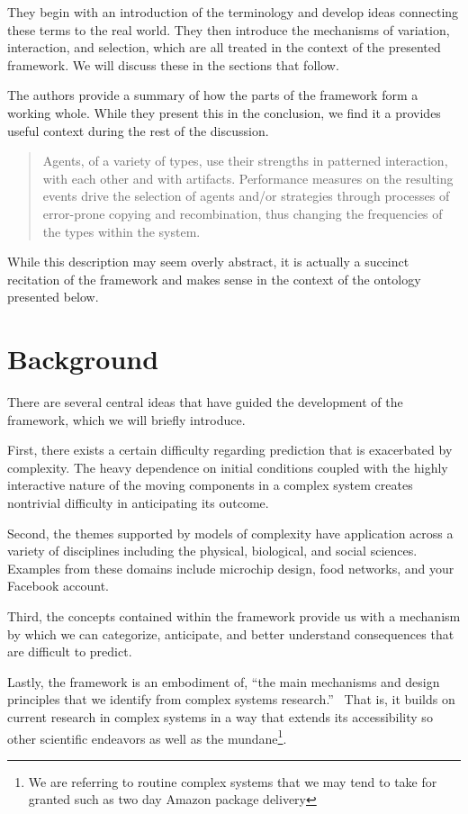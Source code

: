 \documentclass[jou,apacite]{apa6}
\begin{document}
They begin with an introduction of the terminology and develop ideas connecting these terms to the real world.  They then introduce the mechanisms of variation, interaction, and selection, which are all treated in the context of the presented framework.  We will discuss these in the sections that follow.

The authors provide a summary of how the parts of the framework form a working whole.  While they present this in the conclusion, we find it a provides useful context during the rest of the discussion.
\begin{quote}
  Agents, of a variety of types, use their strengths in patterned interaction, with each other and with artifacts.  Performance measures on the resulting events drive the selection of agents and/or strategies through processes of error-prone copying and recombination, thus changing the frequencies of the types within the system.~\cite[page 154]{Axelrod}
\end{quote}
While this description may seem overly abstract, it is actually a succinct recitation of the framework and makes sense in the context of the ontology presented below.

\section{Background}

There are several central ideas that have guided the development of the framework, which we will briefly introduce.

First, there exists a certain difficulty regarding prediction that is exacerbated by complexity.  The heavy dependence on initial conditions coupled with the highly interactive nature of the moving components in a complex system creates nontrivial difficulty in anticipating its outcome.

Second, the themes supported by models of complexity have application across a variety of disciplines including the physical, biological, and social sciences.  Examples from these domains include microchip design, food networks, and your Facebook account.

Third, the concepts contained within the framework provide us with a mechanism by which we can categorize, anticipate, and better understand consequences that are difficult to predict.

Lastly, the framework is an embodiment of, ``the main mechanisms and design principles that we identify from complex systems research.''~\cite[page 2]{Axelrod}  That is, it builds on current research in complex systems in a way that extends its accessibility so other scientific endeavors as well as the mundane\footnote{We are referring to routine complex systems that we may tend to take for granted such as two day Amazon package delivery}.
\end{document}
